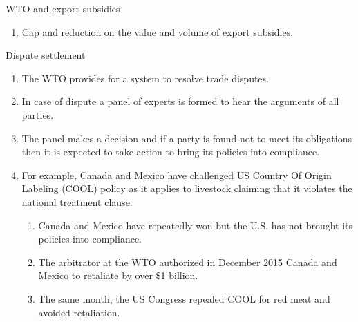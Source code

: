\documentclass[table,xcolor=pdftex,dvipsnames]{beamer}\usepackage[]{graphicx}\usepackage[]{color}
\begin{document}
\begin{frame}{WTO and export subsidies}
\begin{enumerate}[label=\textbullet]
    \item Cap and reduction on the value and volume of export subsidies.
\end{enumerate}
\end{frame}


\begin{frame}{Dispute settlement}
\begin{enumerate}[label=\textbullet]
    \item The WTO provides for a system to resolve trade disputes.
    \item In case of dispute a panel of experts is formed to hear the arguments of all parties.
    \item The panel makes a decision and if a party is found not to meet its obligations then it is expected to take action to bring its policies into compliance.
    \item For example, Canada and Mexico have challenged US Country Of Origin Labeling (COOL) policy as it applies to livestock claiming that it violates the national treatment clause.
        \begin{enumerate}[label=-]
        \item Canada and Mexico have repeatedly won but the U.S. has not brought its policies into compliance.
        \item The arbitrator at the WTO authorized in December 2015 Canada and Mexico to retaliate by over \$1 billion.
        \item The same month, the US Congress repealed COOL for red meat and avoided retaliation.
        \end{enumerate}
\end{enumerate}
\end{frame}

\end{document}
